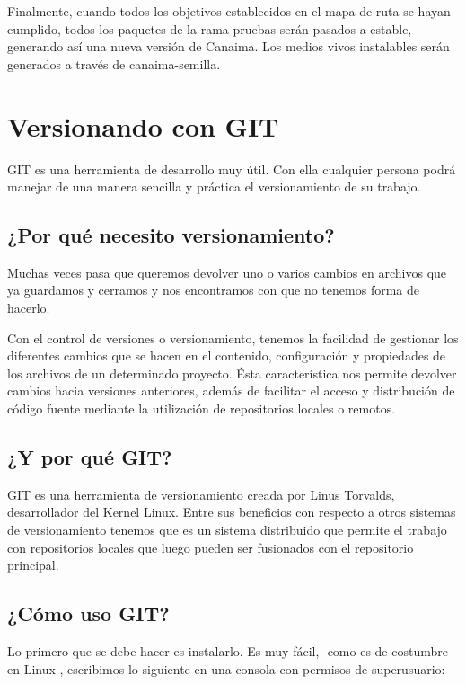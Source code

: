 \documentclass[letterpaper,12pt,spanish]{manual}
\begin{document}
Finalmente, cuando todos los objetivos establecidos en el mapa de ruta se hayan cumplido, todos los paquetes de la rama pruebas serán pasados a estable, generando así una nueva versión de Canaima. Los medios vivos instalables serán generados a través de canaima-semilla.


\section{\textbf{Versionando con GIT}}

GIT es una herramienta de desarrollo muy útil. Con ella cualquier persona podrá manejar de una manera sencilla y práctica el versionamiento de su trabajo.


\subsection{¿Por qué necesito versionamiento?}

Muchas veces pasa que queremos devolver uno o varios cambios en archivos que ya guardamos y cerramos y nos encontramos con que no tenemos forma de hacerlo.

Con el control de versiones o versionamiento, tenemos la facilidad de gestionar los diferentes cambios que se hacen en el contenido, configuración y propiedades de los archivos de un determinado proyecto. Ésta característica nos permite devolver cambios hacia versiones anteriores, además de facilitar el acceso y distribución de código fuente mediante la utilización de repositorios locales o remotos.


\subsection{¿Y por qué GIT?}

GIT es una herramienta de versionamiento creada por Linus Torvalds, desarrollador del Kernel Linux. Entre sus beneficios con respecto a otros sistemas de versionamiento tenemos que es un sistema distribuido que permite el trabajo con repositorios locales que luego pueden ser fusionados con el repositorio principal.


\subsection{¿Cómo uso GIT?}

Lo primero que se debe hacer es instalarlo. Es muy fácil, -como es de costumbre en Linux-, escribimos lo siguiente en una consola con permisos de superusuario:
\end{document}
